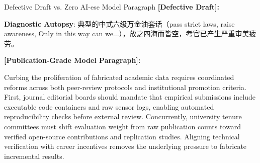 \begin{ExampleBox}{Defective Draft vs. Zero AI-ese Model Paragraph}
\textbf{\color{TargetHighlight}[Defective Draft]:}\par
{}\par\vspace{4pt}
\textbf{Diagnostic Autopsy}: 典型的中式六级万金油套话（pass strict laws, raise awareness, Only in this way can we...），放之四海而皆空，考官已产生严重审美疲劳。\par\vspace{6pt}
\textbf{\color{AcadNavy}[Publication-Grade Model Paragraph]:}\par
Curbing the proliferation of fabricated academic data requires coordinated reforms across both peer-review protocols and institutional promotion criteria. First, journal editorial boards should mandate that empirical submissions include executable code containers and raw sensor logs, enabling automated reproducibility checks before external review. Concurrently, university tenure committees must shift evaluation weight from raw publication counts toward verified open-source contributions and replication studies. Aligning technical verification with career incentives removes the underlying pressure to fabricate incremental results.
\end{ExampleBox}
